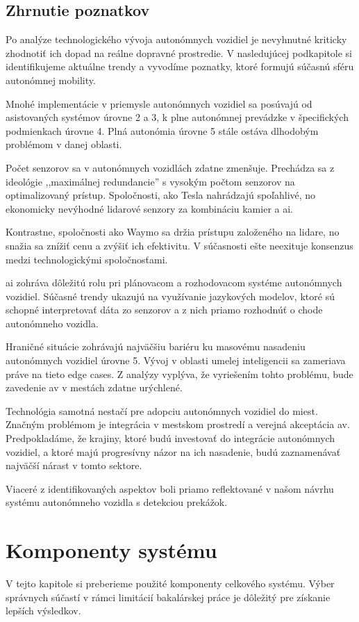 \subsection{Zhrnutie poznatkov}
Po analýze technologického vývoja autonómnych vozidiel je nevyhnutné kriticky zhodnotiť ich dopad na reálne dopravné prostredie. V nasledujúcej podkapitole si identifikujeme aktuálne trendy a vyvodíme poznatky, ktoré formujú súčasnú sféru autonómnej mobility.\par
Mnohé implementácie v priemysle autonómnych vozidiel sa posúvajú od asistovaných systémov úrovne 2 a 3, k plne autonómnej prevádzke v špecifických podmienkach úrovne 4. Plná autonómia úrovne 5 stále ostáva dlhodobým problémom v danej oblasti.\par
Počet senzorov sa v autonómnych vozidlách zdatne zmenšuje. Prechádza sa z ideológie ,,maximálnej redundancie'' s vysokým počtom senzorov na optimalizovaný prístup. Spoločnosti, ako Tesla nahrádzajú spoľahlivé, no ekonomicky nevýhodné \acrshort{lidar}ové senzory za kombináciu kamier a \acrshort{ai}.\par
Kontrastne, spoločnosti ako Waymo sa držia prístupu založeného na \acrshort{lidar}e, no snažia sa znížiť cenu a zvýšiť ich efektivitu. V súčasnosti ešte neexituje konsenzus medzi technologickými spoločnosťami.\par
\acrshort{ai} zohráva dôležitú rolu pri plánovacom a rozhodovacom systéme autonómnych vozidiel. Súčasné trendy ukazujú na využívanie jazykových modelov, ktoré sú schopné interpretovať dáta zo senzorov a z nich priamo rozhodnúť o chode autonómneho vozidla.\par
Hraničné situácie zohrávajú najväčšiu bariéru ku masovému nasadeniu autonómnych vozidiel úrovne 5. Vývoj v oblasti umelej inteligencii sa zameriava práve na tieto edge cases. Z analýzy vyplýva, že vyriešením tohto problému, bude zavedenie \acrshort{av} v mestách zdatne urýchlené.\par
Technológia samotná nestačí pre adopciu autonómnych vozidiel do miest. Značným problémom je integrácia v mestskom prostredí a verejná akceptácia \acrshort{av}. Predpokladáme, že krajiny, ktoré budú investovať do integrácie autonómnych vozidiel, a ktoré majú progresívny názor na ich nasadenie, budú zaznamenávať najväčší nárast v tomto sektore.\par
Viaceré z identifikovaných aspektov boli priamo reflektované v našom návrhu systému autonómneho vozidla s detekciou prekážok.

\section{Komponenty systému}\label{sec:Komponenty}
V tejto kapitole si preberieme použité komponenty celkového systému. Výber správnych súčastí v rámci limitácií bakalárskej práce je dôležitý pre získanie lepších výsledkov.
